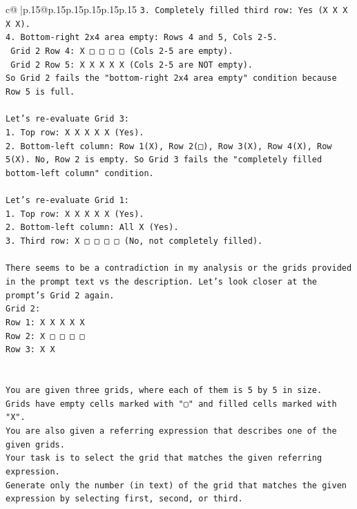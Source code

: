 \documentclass{article}
\begin{document}
{\begin{supertabular}{c@{$\;$}|p{.15\linewidth}@{}p{.15\linewidth}p{.15\linewidth}p{.15\linewidth}p{.15\linewidth}p{.15\linewidth}}
{{{\texttt{3. Completely filled third row: Yes (X X X X X).} \\
\texttt{4. Bottom{-}right 2x4 area empty: Rows 4 and 5, Cols 2{-}5.} \\
\texttt{   Grid 2 Row 4: X □ □ □ □ (Cols 2{-}5 are empty).} \\
\texttt{   Grid 2 Row 5: X X X X X (Cols 2{-}5 are NOT empty).} \\
\texttt{So Grid 2 fails the "bottom{-}right 2x4 area empty" condition because Row 5 is full.} \\
\\ 
\texttt{Let's re{-}evaluate Grid 3:} \\
\texttt{1. Top row: X X X X X (Yes).} \\
\texttt{2. Bottom{-}left column: Row 1(X), Row 2(□), Row 3(X), Row 4(X), Row 5(X). No, Row 2 is empty. So Grid 3 fails the "completely filled bottom{-}left column" condition.} \\
\\ 
\texttt{Let's re{-}evaluate Grid 1:} \\
\texttt{1. Top row: X X X X X (Yes).} \\
\texttt{2. Bottom{-}left column: All X (Yes).} \\
\texttt{3. Third row: X □ □ □ □ (No, not completely filled).} \\
\\ 
\texttt{There seems to be a contradiction in my analysis or the grids provided in the prompt text vs the description. Let's look closer at the prompt's Grid 2 again.} \\
\texttt{Grid 2:} \\
\texttt{Row 1: X X X X X} \\
\texttt{Row 2: X □ □ □ □} \\
\texttt{Row 3: X X} \\
\\ 
\\ 
\texttt{You are given three grids, where each of them is 5 by 5 in size.} \\
\texttt{Grids have empty cells marked with "▢" and filled cells marked with "X".} \\
\texttt{You are also given a referring expression that describes one of the given grids.} \\
\texttt{Your task is to select the grid that matches the given referring expression.} \\
\texttt{Generate only the number (in text) of the grid that matches the given expression by selecting first, second, or third.} \\
}}}
\end{supertabular}}
\end{document}
